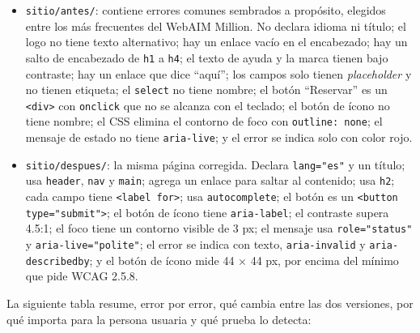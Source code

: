 \documentclass[10pt,letterpaper,onecolumn]{IEEEtran}
\begin{document}
\begin{itemize}
\item
  \texttt{sitio/\allowbreak{}\allowbreak{}antes/\allowbreak{}\allowbreak{}}: contiene errores comunes sembrados a propósito, elegidos entre los más frecuentes del WebAIM Million. No declara idioma ni título; el logo no tiene texto alternativo; hay un enlace vacío en el encabezado; hay un salto de encabezado de \texttt{h1} a \texttt{h4}; el texto de ayuda y la marca tienen bajo contraste; hay un enlace que dice ``aquí''; los campos solo tienen \emph{placeholder} y no tienen etiqueta; el \texttt{select} no tiene nombre; el botón ``Reservar'' es un \texttt{<div>} con \texttt{onclick} que no se alcanza con el teclado; el botón de ícono no tiene nombre; el CSS elimina el contorno de foco con \texttt{outline:\allowbreak{} none}; el mensaje de estado no tiene \texttt{aria-\allowbreak{}\allowbreak{}live}; y el error se indica solo con color rojo.
\item
  \texttt{sitio/\allowbreak{}\allowbreak{}despues/\allowbreak{}\allowbreak{}}: la misma página corregida. Declara \texttt{lang="es"} y un título; usa \texttt{header}, \texttt{nav} y \texttt{main}; agrega un enlace para saltar al contenido; usa \texttt{h2}; cada campo tiene \texttt{<label for>}; usa \texttt{autocomplete}; el botón es un \texttt{<button type="submit">}; el botón de ícono tiene \texttt{aria-\allowbreak{}\allowbreak{}label}; el contraste supera 4.5:1; el foco tiene un contorno visible de 3 px; el mensaje usa \texttt{role="status"} y \texttt{aria-\allowbreak{}\allowbreak{}live="polite"}; el error se indica con texto, \texttt{aria-\allowbreak{}\allowbreak{}invalid} y \texttt{aria-\allowbreak{}\allowbreak{}describedby}; y el botón de ícono mide 44 × 44 px, por encima del mínimo que pide WCAG 2.5.8.
\end{itemize}

La siguiente tabla resume, error por error, qué cambia entre las dos versiones, por qué importa para la persona usuaria y qué prueba lo detecta:
\end{document}
